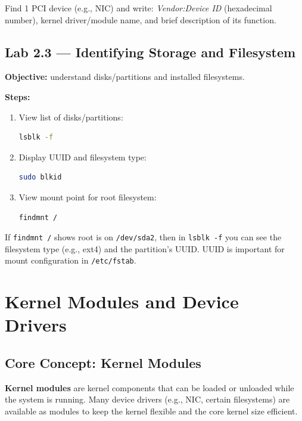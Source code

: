 \begin{exercisebox}[2.2]
Find 1 PCI device (e.g., NIC) and write: \textit{Vendor:Device ID} (hexadecimal number), kernel driver/module name, and brief description of its function.
\end{exercisebox}

\subsection*{Lab 2.3 --- Identifying Storage and Filesystem}
\textbf{Objective:} understand disks/partitions and installed filesystems.

\textbf{Steps:}
\begin{enumerate}
    \item View list of disks/partitions:
\begin{lstlisting}[language=bash, caption={View block devices and filesystem}]
lsblk -f
\end{lstlisting}

    \item Display UUID and filesystem type:
\begin{lstlisting}[language=bash, caption={View filesystem UUID}]
sudo blkid
\end{lstlisting}

    \item View mount point for root filesystem:
\begin{lstlisting}[language=bash, caption={View device for root filesystem}]
findmnt /
\end{lstlisting}
\end{enumerate}

\begin{examplebox}
If \texttt{findmnt /} shows root is on \texttt{/dev/sda2}, then in \texttt{lsblk -f} you can see the filesystem type (e.g., ext4)
and the partition's UUID. UUID is important for mount configuration in \texttt{/etc/fstab}.
\end{examplebox}


\section{Kernel Modules and Device Drivers}
\label{sec:kernel-modules}

\subsection*{Core Concept: Kernel Modules}
\textbf{Kernel modules} are kernel components that can be loaded or unloaded while the system is running.
Many device drivers (e.g., NIC, certain filesystems) are available as modules to keep the kernel flexible and the core kernel size efficient.


